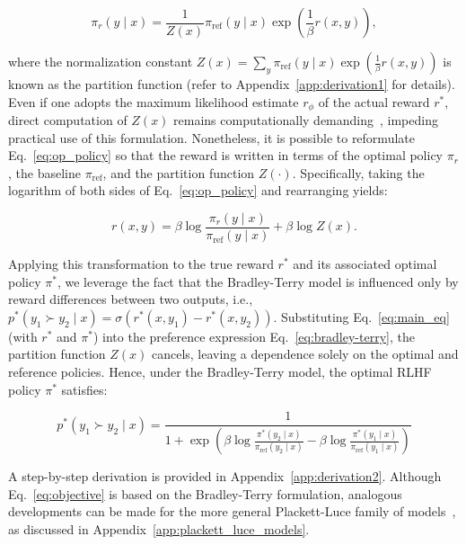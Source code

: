 \begin{equation}\label{eq:op_policy}
    \pi_r(y\mid x) = \frac{1}{Z(x)}\pi_\text{ref}(y\mid x)\exp\left(\frac{1}{\beta}r(x, y)\right),
\end{equation}

where the normalization constant $Z(x) = \sum_{y}\pi_\text{ref}(y\mid x)\exp\left(\frac{1}{\beta}r(x, y)\right)$ is known as the partition function (refer to Appendix~\ref{app:derivation1} for details). Even if one adopts the maximum likelihood estimate $r_{\phi}$ of the actual reward $r^*$, direct computation of $Z(x)$ remains computationally demanding~\citep{korbak2022reinforcement, go2023aligning}, impeding practical use of this formulation. Nonetheless, it is possible to reformulate Eq.~\ref{eq:op_policy} so that the reward is written in terms of the optimal policy $\pi_r$, the baseline $\pi_\text{ref}$, and the partition function $Z(\cdot)$. Specifically, taking the logarithm of both sides of Eq.~\ref{eq:op_policy} and rearranging yields:

\begin{equation}\label{eq:main_eq}
    r(x,y) = \beta \log \frac{\pi_r(y\mid x)}{\pi_\text{ref}(y\mid x)} + \beta \log Z(x).
\end{equation}

Applying this transformation to the true reward $r^*$ and its associated optimal policy $\pi^*$, we leverage the fact that the Bradley-Terry model is influenced only by reward differences between two outputs, i.e., ${p^*(y_1 \succ y_2 \mid x) = \sigma(r^*(x, y_1) - r^*(x, y_2))}$. Substituting Eq.~\ref{eq:main_eq} (with $r^*$ and $\pi^*$) into the preference expression Eq.~\ref{eq:bradley-terry}, the partition function $Z(x)$ cancels, leaving a dependence solely on the optimal and reference policies. Hence, under the Bradley-Terry model, the optimal RLHF policy $\pi^*$ satisfies:

\begin{equation}\label{eq:objective}
    p^*(y_1\succ y_2 \mid x) = \frac{1}{1 + \exp\left(\beta \log \frac{\pi^*(y_2\mid x)}{\pi_\text{ref}(y_2\mid x)} - \beta \log \frac{\pi^*(y_1\mid x)}{\pi_\text{ref}(y_1\mid x)}\right)}
\end{equation}

A step-by-step derivation is provided in Appendix~\ref{app:derivation2}. Although Eq.~\ref{eq:objective} is based on the Bradley-Terry formulation, analogous developments can be made for the more general Plackett-Luce family of models~\citep{plackett1975analysis, luce2012individual}, as discussed in Appendix~\ref{app:plackett_luce_models}.

